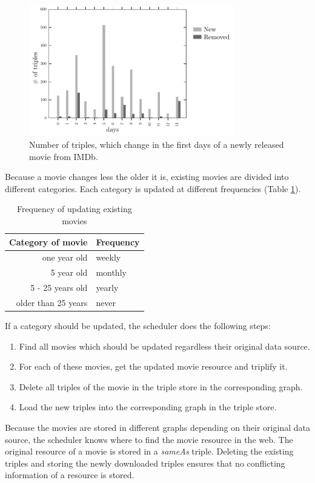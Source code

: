 \begin{figure}[h!]
  \begin{center}
  \includegraphics[width=0.8\textwidth]{images/updating_2.pdf}
  \end{center}
  \caption{Number of triples, which change in the first days of a newly released movie from IMDb.}
  \label{fig_new_movie}
\end{figure}

Because a movie changes less the older it is, existing movies are divided into different categories.
Each category is updated at different frequencies (Table \ref{tab_updating_existing}).
\begin{table}[ht]
	\begin{center}
	\begin{tabular}{rl}
		\textbf{Category of movie} & \textbf{Frequency} \\ \hline
		one year old & weekly \\
		5 year old & monthly \\
		5 - 25 years old & yearly \\
		older than 25 years & never \\
	\end{tabular}
	\end{center}
	\caption{Frequency of updating existing movies}
	\label{tab_updating_existing}
\end{table}
If a category should be updated, the scheduler does the following steps:
\begin{enumerate}
	\item Find all movies which should be updated regardless their original data source.
	\item For each of these movies, get the updated movie resource and triplify it.
	\item Delete all triples of the movie in the triple store in the corresponding graph.
	\item Load the new triples into the corresponding graph in the triple store.
\end{enumerate}
Because the movies are stored in different graphs depending on their original data source, the scheduler knows where to find the movie resource in the web.
The original resource of a movie is stored in a \emph{sameAs} triple.
Deleting the existing triples and storing the newly downloaded triples ensures that no conflicting information of a resource is stored.